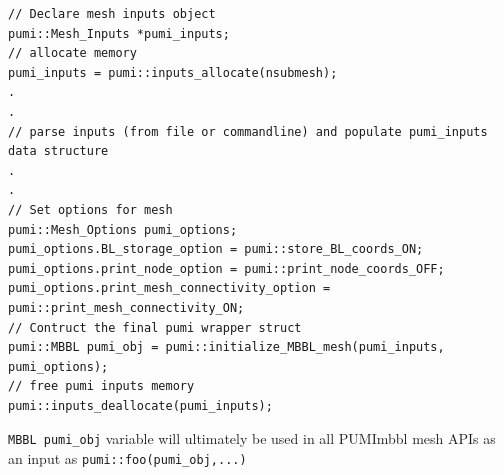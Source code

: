 \documentclass[a4paper,12pt]{article}
\begin{document}
\begin{lstlisting}
// Declare mesh inputs object
pumi::Mesh_Inputs *pumi_inputs;
// allocate memory
pumi_inputs = pumi::inputs_allocate(nsubmesh);
.
.
// parse inputs (from file or commandline) and populate pumi_inputs data structure
.
.	
// Set options for mesh
pumi::Mesh_Options pumi_options;
pumi_options.BL_storage_option = pumi::store_BL_coords_ON;
pumi_options.print_node_option = pumi::print_node_coords_OFF;
pumi_options.print_mesh_connectivity_option = pumi::print_mesh_connectivity_ON;
// Contruct the final pumi wrapper struct
pumi::MBBL pumi_obj = pumi::initialize_MBBL_mesh(pumi_inputs, pumi_options);
// free pumi inputs memory
pumi::inputs_deallocate(pumi_inputs);
\end{lstlisting}

\texttt{MBBL pumi\_obj} variable will ultimately be used in all PUMImbbl mesh APIs as an input as \texttt{pumi::foo(pumi\_obj,...)}
\end{document}
